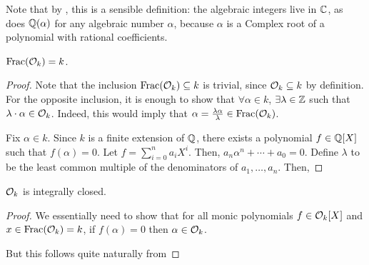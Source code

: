 Note that by , this is a sensible definition: the algebraic integers live in $\mathbb{C}$, as does $\mathbb{Q}(\alpha)$ for any algebraic number $\alpha$, because $\alpha$ is a Complex root of a polynomial with rational coefficients.

\begin{boxproposition}
    $\operatorname{Frac}\!\left( \mathcal{O}_k \right) = k$.
\end{boxproposition}
\begin{proof}
    Note that the inclusion $\operatorname{Frac}\!\left( \mathcal{O}_k \right) \subseteq k$ is trivial, since $\mathcal{O}_k \subseteq k$ by definition. For the opposite inclusion, it is enough to show that $\forall \alpha \in k$, $\exists \lambda \in \mathbb{Z}$ such that $\lambda \cdot \alpha \in \mathcal{O}_k$. Indeed, this would imply that $\alpha = \frac{\lambda \alpha}{\lambda} \in \operatorname{Frac}\!\left( \mathcal{O}_k \right)$.

    Fix $\alpha \in k$. Since $k$ is a finite extension of $\mathbb{Q}$, there exists a polynomial $f \in \mathbb{Q}[X]$ such that $f(\alpha) = 0$. Let $f = \sum_{i=0}^n a_i X^i$. Then, $a_n \alpha^n + \cdots + a_0 = 0$. Define $\lambda$ to be the least common multiple of the denominators of $a_1, \ldots, a_n$. Then, \sorry
\end{proof}

\begin{boxproposition}
    $\mathcal{O}_k$ is integrally closed.
\end{boxproposition}
\begin{proof}
    We essentially need to show that for all monic polynomials $f \in \mathcal{O}_k[X]$ and $x \in \operatorname{Frac}\!\left( \mathcal{O}_k \right) = k$, if $f(\alpha) = 0$ then $\alpha \in \mathcal{O}_k$.

    But this follows quite naturally from \sorry
\end{proof}


